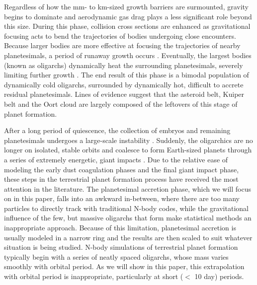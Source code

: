 \documentclass[twocolumn]{aastex63}
\begin{document}
Regardless of how the mm- to km-sized growth barriers are surmounted, gravity begins to dominate and aerodynamic gas drag plays a less significant role beyond this size. During this phase, collision cross sections are enhanced as gravitational focusing \citep{safronov69} acts to bend the trajectories of bodies undergoing close encounters. Because larger bodies are more effective at focusing the trajectories of nearby planetesimals, a period of runaway growth occurs \citep{wetherill89, kokubo96, barnes09}. Eventually, the largest bodies (known as oligarchs) dynamically heat the surrounding planetesimals, severely limiting further growth \citep{kokubo98}. The end result of this phase is a bimodal population of dynamically cold oligarchs, surrounded by dynamically hot, difficult to accrete residual planetesimals. Lines of evidence suggest that the asteroid belt, Kuiper belt and the Oort cloud are largely composed of the leftovers of this stage of planet formation.

After a long period of quiescence, the collection of embryos and remaining planetesimals undergoes a large-scale instability \citep{chambers98}. Suddenly, the oligarchics are no longer on isolated, stable orbits and coalesce to form Earth-sized planets through a series of extremely energetic, giant impacts \citep{kokubo02, raymond05, raymond06}. Due to the relative ease of modeling the early dust coagulation phases and the final giant impact phase, these steps in the terrestrial planet formation process have received the most attention in the literature. The planetesimal accretion phase, which we will focus on in this paper, falls into an awkward in-between, where there are too many particles to directly track with traditional N-body codes, while the gravitational influence of the few, but massive oligarchs that form make statistical methods an inappropriate approach. Because of this limitation, planetesimal accretion is usually modeled in a narrow ring and the results are then scaled to suit whatever situation is being studied. N-body simulations of terrestrial planet formation typically begin with a series of neatly spaced oligarchs, whose mass varies smoothly with orbital period. As we will show in this paper, this extrapolation with orbital period is inappropriate, particularly at short ($<$ 10 day) periods.
\end{document}
